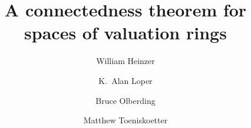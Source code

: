 \documentclass[preprint, 11pt,nonatbib]{elsarticle}
\theoremstyle{definition}
\numberwithin{theorem}{section}
\begin{document}
\begin{frontmatter}






\title{A connectedness theorem for spaces of valuation rings} 




\author[Heinzer]{William Heinzer}
\address[Heinzer]{Department of Mathematics, Purdue University, West
Lafayette, Indiana 47907-1395}

\author[Loper]{K.~Alan Loper}
\address[Loper]{Department of Mathematics, Ohio State University -- Newark,  Newark, OH 43055}

\author[Olberding]{Bruce Olberding} 
\address[Olberding]{Department of Mathematical Sciences, New Mexico State University,
 Las Cruces, NM 88003-8001}

\author[Toeniskoetter]{Matthew Toeniskoetter} 
\address[Toeniskoetter]{Department of Mathematics and Statistics, Oakland University, Rochester, MI 48309-4479}
 





\end{frontmatter}
\end{document}

